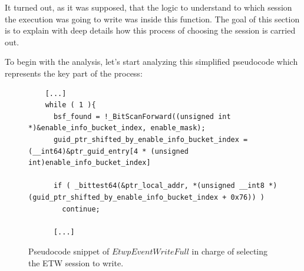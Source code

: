 It turned out, as it was supposed, that the logic to understand to which session the execution was going to write was inside this function. The goal of this section is to explain with deep details how this process of choosing the session is carried out. 

To begin with the analysis, let's start analyzing this simplified pseudocode which represents the key part of the process:

\begin{figure}[H]
  \begin{lstlisting}
    [...]
    while ( 1 ){                  
      bsf_found = !_BitScanForward((unsigned int *)&enable_info_bucket_index, enable_mask);
      guid_ptr_shifted_by_enable_info_bucket_index = (__int64)&ptr_guid_entry[4 * (unsigned int)enable_info_bucket_index]
      
      if ( _bittest64(&ptr_local_addr, *(unsigned __int8 *)(guid_ptr_shifted_by_enable_info_bucket_index + 0x76)) )
        continue;

      [...]
  \end{lstlisting} 
  \caption[]{Pseudocode snippet of $EtwpEventWriteFull$ in charge of selecting the ETW session to write.}
  \label{fig:session_to_write_selection}
\end{figure}

